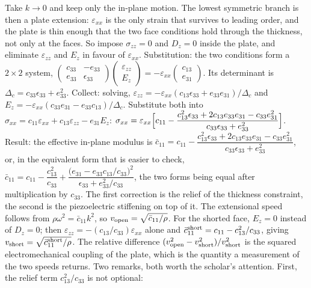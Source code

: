 \documentclass[11pt]{article}
\makeatletter
\newif\ifshowworked
\newenvironment{worked}{%
  \ifshowworked\par\smallskip\noindent\textit{Working.}\par\smallskip\else
  \setbox\z@\vbox\bgroup\fi}{\ifshowworked\par\smallskip\else\egroup\fi}
\makeatother
\begin{document}
\begin{worked}
Take $k\to0$ and keep only the in-plane motion. The lowest symmetric branch is then a plate extension:
$\varepsilon_{xx}$ is the only strain that survives to leading order, and the plate is thin enough that
the two face conditions hold through the thickness, not only at the faces. So impose
$\sigma_{zz}=0$ and $D_z=0$ inside the plate, and eliminate $\varepsilon_{zz}$ and $E_z$ in favour of
$\varepsilon_{xx}$.
Substitution: the two conditions form a $2\times2$ system,
$\begin{pmatrix}c_{33}&-e_{33}\\ e_{33}&\epsilon_{33}\end{pmatrix}
\begin{pmatrix}\varepsilon_{zz}\\ E_z\end{pmatrix}
=-\varepsilon_{xx}\begin{pmatrix}c_{13}\\ e_{31}\end{pmatrix}$.
Its determinant is $\Delta_c=c_{33}\epsilon_{33}+e_{33}^2$.
Collect: solving,
$\varepsilon_{zz}=-\varepsilon_{xx}(c_{13}\epsilon_{33}+e_{33}e_{31})/\Delta_c$ and
$E_z=-\varepsilon_{xx}(c_{33}e_{31}-e_{33}c_{13})/\Delta_c$.
Substitute both into $\sigma_{xx}=c_{11}\varepsilon_{xx}+c_{13}\varepsilon_{zz}-e_{31}E_z$:
$\sigma_{xx}=\varepsilon_{xx}\Bigl[c_{11}-\dfrac{c_{13}^2\epsilon_{33}+2c_{13}e_{33}e_{31}-c_{33}e_{31}^2}
{c_{33}\epsilon_{33}+e_{33}^2}\Bigr]$.
Result: the effective in-plane modulus is
$\bar c_{11}=c_{11}-\dfrac{c_{13}^2\epsilon_{33}+2c_{13}e_{33}e_{31}-c_{33}e_{31}^2}
{c_{33}\epsilon_{33}+e_{33}^2}$,
or, in the equivalent form that is easier to check,
$\bar c_{11}=c_{11}-\dfrac{c_{13}^2}{c_{33}}
+\dfrac{\bigl(e_{31}-e_{33}c_{13}/c_{33}\bigr)^2}{\epsilon_{33}+e_{33}^2/c_{33}}$,
the two forms being equal after multiplication by $c_{33}$. The first correction is the relief of the
thickness constraint, the second is the piezoelectric stiffening on top of it.
The extensional speed follows from $\rho\omega^2=\bar c_{11}k^2$, so
$v_{\rm open}=\sqrt{\bar c_{11}/\rho}$.
For the shorted face, $E_z=0$ instead of $D_z=0$; then $\varepsilon_{zz}=-(c_{13}/c_{33})\varepsilon_{xx}$
alone and $\bar c_{11}^{\rm short}=c_{11}-c_{13}^2/c_{33}$, giving
$v_{\rm short}=\sqrt{\bar c_{11}^{\rm short}/\rho}$. The relative difference
$(v_{\rm open}^2-v_{\rm short}^2)/v_{\rm short}^2$ is the squared electromechanical coupling of the plate,
which is the quantity a measurement of the two speeds returns.
Two remarks, both worth the scholar's attention. First, the relief term $c_{13}^2/c_{33}$ is not optional:

\end{worked}
\end{document}
